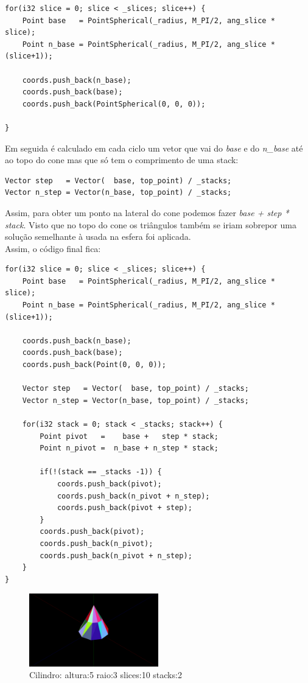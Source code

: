 \documentclass[a4paper]{report}
\begin{document}
\begin{lstlisting}
for(i32 slice = 0; slice < _slices; slice++) {
    Point base   = PointSpherical(_radius, M_PI/2, ang_slice *  slice);
    Point n_base = PointSpherical(_radius, M_PI/2, ang_slice * (slice+1));

    coords.push_back(n_base);
    coords.push_back(base);
    coords.push_back(PointSpherical(0, 0, 0));

}
\end{lstlisting}
Em seguida é calculado em cada ciclo um vetor que vai do \textit{base} e do
\textit{n\_base} até ao topo do cone mas que só tem o comprimento de uma stack:

\begin{lstlisting}
Vector step   = Vector(  base, top_point) / _stacks;
Vector n_step = Vector(n_base, top_point) / _stacks;
\end{lstlisting}
Assim, para obter um ponto na lateral do cone podemos fazer \textit{base + step
* stack}. Visto que no topo do cone os triângulos também se iriam sobrepor uma
solução semelhante à usada na esfera foi aplicada.\\
Assim, o código final fica:

\begin{lstlisting}
for(i32 slice = 0; slice < _slices; slice++) {
    Point base   = PointSpherical(_radius, M_PI/2, ang_slice *  slice);
    Point n_base = PointSpherical(_radius, M_PI/2, ang_slice * (slice+1));

    coords.push_back(n_base);
    coords.push_back(base);
    coords.push_back(Point(0, 0, 0));

    Vector step   = Vector(  base, top_point) / _stacks;
    Vector n_step = Vector(n_base, top_point) / _stacks;

    for(i32 stack = 0; stack < _stacks; stack++) {
        Point pivot   =    base +   step * stack;
        Point n_pivot =  n_base + n_step * stack;

        if(!(stack == _stacks -1)) {
            coords.push_back(pivot);
            coords.push_back(n_pivot + n_step);
            coords.push_back(pivot + step);
        }
        coords.push_back(pivot);
        coords.push_back(n_pivot);
        coords.push_back(n_pivot + n_step);
    }
}
\end{lstlisting}

\begin{figure}[H]
    \centering 
    \includegraphics[width=0.5\textwidth]{images/cone.png}  
    \caption{Cilindro: altura:5 raio:3 slices:10 stacks:2}
    \label{fig:cilindro_render}
\end{figure}
\end{document}
